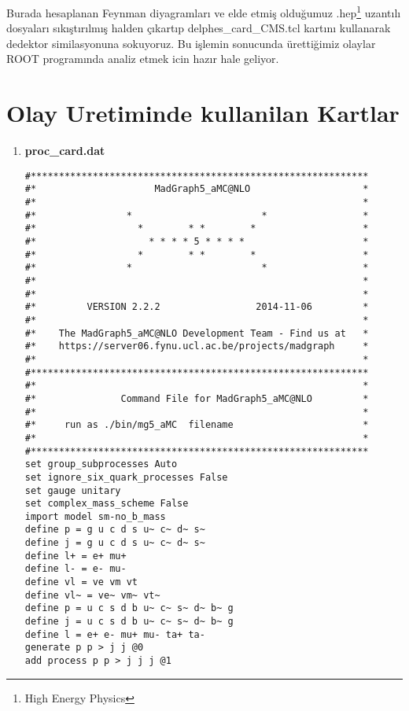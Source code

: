 Burada hesaplanan Feynman diyagramları ve elde etmiş olduğumuz .hep\footnote{High Energy Physics} uzantılı dosyaları sıkıştırılmış halden çıkartıp delphes\_card\_CMS.tcl kartını kullanarak dedektor similasyonuna sokuyoruz. Bu işlemin sonucunda ürettiğimiz olaylar ROOT programında analiz etmek icin hazır hale geliyor.
\section{Olay Uretiminde kullanilan Kartlar} 
\begin{enumerate}


\item \textbf{proc\_card.dat}

\begin{lstlisting}
#************************************************************
#*                     MadGraph5_aMC@NLO                    *
#*                                                          *
#*                *                       *                 *
#*                  *        * *        *                   *
#*                    * * * * 5 * * * *                     *
#*                  *        * *        *                   *
#*                *                       *                 *
#*                                                          *
#*                                                          *
#*         VERSION 2.2.2                 2014-11-06         *
#*                                                          *
#*    The MadGraph5_aMC@NLO Development Team - Find us at   *
#*    https://server06.fynu.ucl.ac.be/projects/madgraph     *
#*                                                          *
#************************************************************
#*                                                          *
#*               Command File for MadGraph5_aMC@NLO         *
#*                                                          *
#*     run as ./bin/mg5_aMC  filename                       *
#*                                                          *
#************************************************************
set group_subprocesses Auto
set ignore_six_quark_processes False
set gauge unitary
set complex_mass_scheme False
import model sm-no_b_mass
define p = g u c d s u~ c~ d~ s~
define j = g u c d s u~ c~ d~ s~
define l+ = e+ mu+
define l- = e- mu-
define vl = ve vm vt
define vl~ = ve~ vm~ vt~
define p = u c s d b u~ c~ s~ d~ b~ g
define j = u c s d b u~ c~ s~ d~ b~ g
define l = e+ e- mu+ mu- ta+ ta-
generate p p > j j @0
add process p p > j j j @1

\end{lstlisting}
\end{enumerate}
